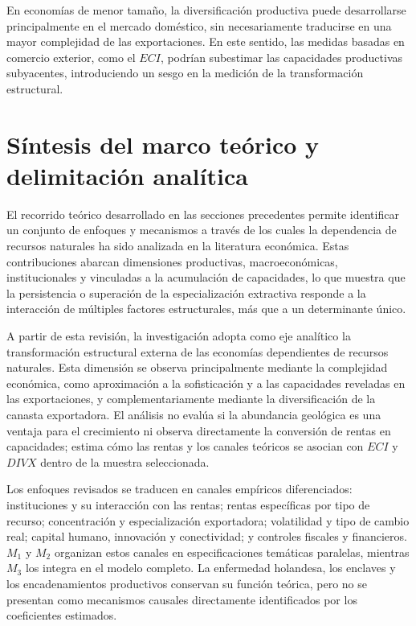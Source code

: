 \documentclass[../../TFM.tex]{subfiles}
\begin{document}
	En economías de menor tamaño, la diversificación productiva puede desarrollarse principalmente en el mercado doméstico, sin necesariamente traducirse en una mayor complejidad de las exportaciones. En este sentido, las medidas basadas en comercio exterior, como el $ECI$, podrían subestimar las capacidades productivas subyacentes, introduciendo un sesgo en la medición de la transformación estructural.
	
	\section{Síntesis del marco teórico y delimitación analítica}
	\label{sec:sintesis-marco-teorico}
	
	El recorrido teórico desarrollado en las secciones precedentes permite identificar un conjunto de enfoques y mecanismos a través de los cuales la dependencia de recursos naturales ha sido analizada en la literatura económica. Estas contribuciones abarcan dimensiones productivas, macroeconómicas, institucionales y vinculadas a la acumulación de capacidades, lo que muestra que la persistencia o superación de la especialización extractiva responde a la interacción de múltiples factores estructurales, más que a un determinante único.
	
	A partir de esta revisión, la investigación adopta como eje analítico la
	transformación estructural externa de las economías dependientes de recursos
	naturales. Esta dimensión se observa principalmente mediante la complejidad
	económica, como aproximación a la sofisticación y a las capacidades reveladas
	en las exportaciones, y complementariamente mediante la diversificación de la
	canasta exportadora. El análisis no evalúa si la abundancia geológica es una
	ventaja para el crecimiento ni observa directamente la conversión de rentas en
	capacidades; estima cómo las rentas y los canales teóricos se asocian con
	$ECI$ y $DIVX$ dentro de la muestra seleccionada.

	Los enfoques revisados se traducen en canales empíricos diferenciados:
	instituciones y su interacción con las rentas; rentas específicas por tipo de
	recurso; concentración y especialización exportadora; volatilidad y tipo de
	cambio real; capital humano, innovación y conectividad; y controles fiscales y
	financieros. $M_1$ y $M_2$ organizan estos canales en especificaciones
	temáticas paralelas, mientras $M_3$ los integra en el modelo completo. La
	enfermedad holandesa, los enclaves y los encadenamientos productivos conservan
	su función teórica, pero no se presentan como mecanismos causales directamente
	identificados por los coeficientes estimados.
	



\end{document}
